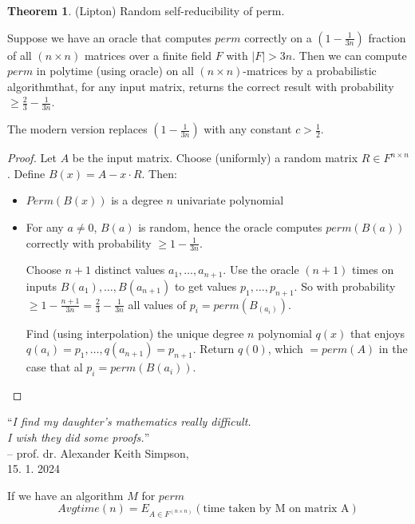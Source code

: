 \documentclass[a4paper,12pt]{article}
\theoremstyle{definition}
\newtheorem{theorem}[counter]{Theorem}
\theoremstyle{remark}
\begin{document}
\begin{theorem}
    (Lipton)
    Random self-reducibility of perm.

    Suppose we have an oracle that computes $perm$ correctly on a $(1 - \frac{1}{3n})$ 
    fraction of all $(n \times n)$ matrices over a finite field $F$ with $|F| > 3n$.
    Then we can compute $perm$ in polytime (using oracle) on all $(n \times n)$-matrices 
    by a probabilistic algorithmthat, for any input matrix, returns the correct result with 
    probability $\geq \frac{2}{3} - \frac{1}{3n}$.
\end{theorem}

The modern version replaces $(1 - \frac{1}{3n})$  with any constant $c > \frac{1}{2}$.

\begin{proof}
    Let $A$ be the input matrix. Choose (uniformly) a random matrix $R \in F^{n \times n}$.
    Define $B(x) = A - x \cdot R$. Then:
    \begin{itemize}
        \item $Perm(B(x))$ is a degree $n$ univariate polynomial
        \item For any $a \neq 0$, $B(a)$ is random, hence the oracle computes $perm(B(a))$ 
        correctly with probability $\geq 1 - \frac{1}{3n}$.

        Choose $n + 1$ distinct values $a_1, \dots, a_{n + 1}$. Use the oracle $(n + 1)$ times on inputs $B(a_1), \dots, B(a_{n+1})$
        to get values $p_1, \dots, p_{n+1}$. So with probability $\geq 1 - \frac{n + 1}{3n} = \frac{2}{3} - \frac{1}{3n}$ all values
        of $p_i = perm(B_(a_i))$.

        Find (using interpolation) the unique degree $n$ polynomial $q(x)$ that enjoys $q(a_i) = p_1, \dots, q(a_{n + 1}) = p_{n + 1}$.
        Return $q(0)$, which $= perm(A)$ in the case that al $p_i = perm(B(a_i))$.
    \end{itemize}
\end{proof}

\begin{center}
    \enquote{\textit{I find my daughter's mathematics really difficult. \\
    I wish they did some proofs.}}\\ 
    \hfill -- prof. dr. Alexander Keith Simpson, \\
    \hfill 15. 1. 2024
\end{center}


If we have an algorithm $M$ for $perm$
\begin{equation*}
    Avgtime(n) = E_{A \in F^{(n \times n)}} (\text{time taken by M on matrix A})
\end{equation*}
\end{document}
